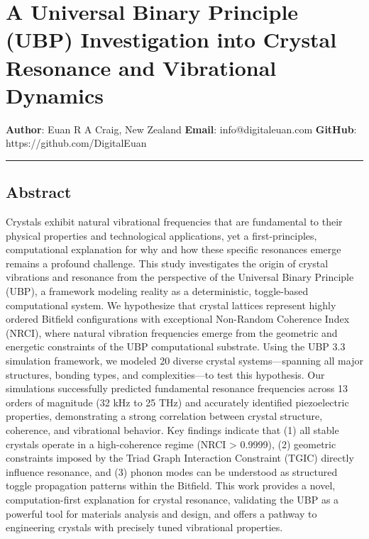 \section{A Universal Binary Principle (UBP) Investigation into Crystal
Resonance and Vibrational
Dynamics}\label{a-universal-binary-principle-ubp-investigation-into-crystal-resonance-and-vibrational-dynamics}

\textbf{Author}: Euan R A Craig, New Zealand \textbf{Email}:
info@digitaleuan.com \textbf{GitHub}: https://github.com/DigitalEuan

\begin{center}\rule{0.5\linewidth}{0.5pt}\end{center}

\subsection{Abstract}\label{abstract}

Crystals exhibit natural vibrational frequencies that are fundamental to
their physical properties and technological applications, yet a
first-principles, computational explanation for why and how these
specific resonances emerge remains a profound challenge. This study
investigates the origin of crystal vibrations and resonance from the
perspective of the Universal Binary Principle (UBP), a framework
modeling reality as a deterministic, toggle-based computational system.
We hypothesize that crystal lattices represent highly ordered Bitfield
configurations with exceptional Non-Random Coherence Index (NRCI), where
natural vibration frequencies emerge from the geometric and energetic
constraints of the UBP computational substrate. Using the UBP 3.3
simulation framework, we modeled 20 diverse crystal systems---spanning
all major structures, bonding types, and complexities---to test this
hypothesis. Our simulations successfully predicted fundamental resonance
frequencies across 13 orders of magnitude (32 kHz to 25 THz) and
accurately identified piezoelectric properties, demonstrating a strong
correlation between crystal structure, coherence, and vibrational
behavior. Key findings indicate that (1) all stable crystals operate in
a high-coherence regime (NRCI \textgreater{} 0.9999), (2) geometric
constraints imposed by the Triad Graph Interaction Constraint (TGIC)
directly influence resonance, and (3) phonon modes can be understood as
structured toggle propagation patterns within the Bitfield. This work
provides a novel, computation-first explanation for crystal resonance,
validating the UBP as a powerful tool for materials analysis and design,
and offers a pathway to engineering crystals with precisely tuned
vibrational properties.

